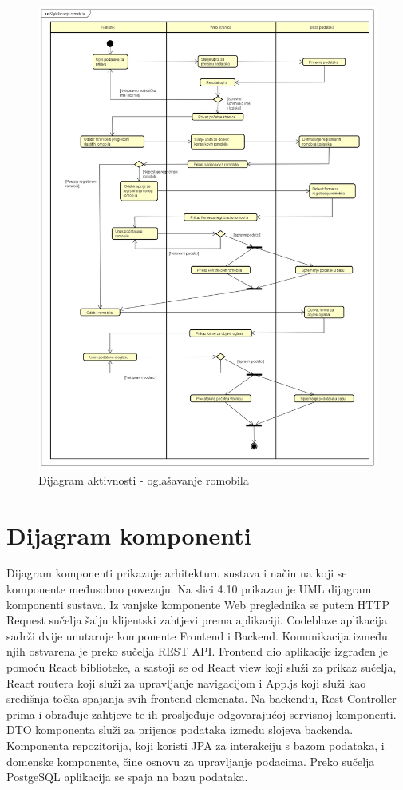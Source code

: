 \begin{figure} [H]

	\includegraphics[width=1\linewidth]{slike/ActivityDiagram.png}
	\centering
	\caption{Dijagram aktivnosti - oglašavanje romobila}
	\label{fig:Dijagram aktivnosti - oglašavanje romobila}
\end{figure}

\eject

\section{Dijagram komponenti}



Dijagram komponenti prikazuje arhitekturu sustava i način na koji se komponente međusobno povezuju. Na slici 4.10 prikazan je UML dijagram komponenti sustava. Iz vanjske komponente Web preglednika se putem HTTP Request sučelja šalju klijentski zahtjevi prema aplikaciji. Codeblaze aplikacija sadrži dvije unutarnje komponente Frontend i Backend. Komunikacija između njih ostvarena je preko sučelja REST API. Frontend dio aplikacije izgrađen je pomoću React biblioteke, a sastoji se od React view koji služi za prikaz sučelja, React routera koji služi za upravljanje navigacijom i App.js koji služi kao središnja točka spajanja svih frontend elemenata. Na backendu, Rest Controller prima i obrađuje zahtjeve te ih prosljeđuje odgovarajućoj servisnoj komponenti. DTO komponenta služi za prijenos podataka između slojeva backenda. Komponenta repozitorija, koji koristi JPA za interakciju s bazom podataka, i domenske komponente, čine osnovu za upravljanje podacima. Preko sučelja PostgeSQL aplikacija se spaja na bazu podataka. 

